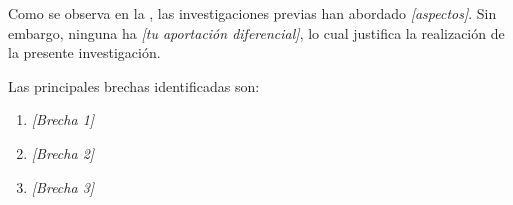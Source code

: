 Como se observa en la , las investigaciones previas han abordado \textit{[aspectos]}. Sin embargo, ninguna ha \textit{[tu aportación diferencial]}, lo cual justifica la realización de la presente investigación.

Las principales brechas identificadas son:
\begin{enumerate}
    \item \textit{[Brecha 1]}
    \item \textit{[Brecha 2]}
    \item \textit{[Brecha 3]}
\end{enumerate}

% 
%
%
%
